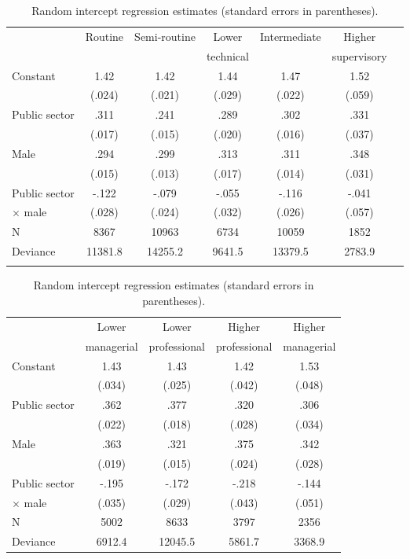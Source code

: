 \documentclass[a4paper,11pt,titlepage]{article}
\begin{document}
\begin{table}[tb]
\caption{Random intercept regression estimates (standard errors in parentheses).\label{tab:baseline}}
\begin{center}
\begin{tabular}{lcccccc}
\toprule
            &Routine            &Semi-routine &Lower &Intermediate    &Higher \\
            &       &   & technical & & supervisory \\
\midrule
Constant	        &1.42 	            &1.42 	   &1.44	  	&1.47 	   &1.52\\
					&(.024)	            &(.021)	   &(.029)	    &(.022)	   &(.059)\\
Public sector       &.311		        &.241	   &.289		&.302	   &.331\\
					&(.017)	            &(.015)	   &(.020)	    &(.016)	   &(.037)\\
Male			    &.294				&.299	   &.313        &.311	   &.348\\
					&(.015)				&(.013)	   &(.017)	    &(.014)	   &(.031)\\
Public sector       & -.122				&-.079	   &-.055		&-.116	   &-.041\\
\quad $\times$ male &(.028)		        &(.024)	   &(.032)		&(.026)	   &(.057)\\
\midrule
N					&8367  	            &10963 	   &6734       &10059 	   &1852    \\
Deviance	        &11381.8	        &14255.2   &9641.5     &13379.5	   &2783.9\\
\\
\bottomrule
\end{tabular}

\begin{tabular}{lcccc}
\\
\toprule
			&Lower & Lower &Higher &Higher \\
            &managerial & professional & professional & managerial \\
\midrule
Constant	        &1.43	    &1.43	   &1.42	   	&1.53	      	\\
					&(.034)	    &(.025)	   &(.042)	    &(.048)	        \\
Public sector       &.362 	    &.377      &.320     	&.306 	        \\
                    &(.022)     &(.018)	   &(.028)	    &(.034)	        \\
Male				&.363		&.321	   &.375		&.342	        \\
					&(.019)		&(.015)	   &(.024)		&(.028)			\\
Public sector       &-.195		&-.172	   &-.218		&-.144			\\
\quad $\times$ male &(.035)     &(.029)	   &(.043)		&(.051)			\\
\midrule
N 		  	        &5002       &8633      &3797    	&2356          \\
Deviance	        &6912.4	    &12045.5   &5861.7     &3368.9         \\
\bottomrule
\end{tabular}
\end{center}
\end{table}
\end{document}
